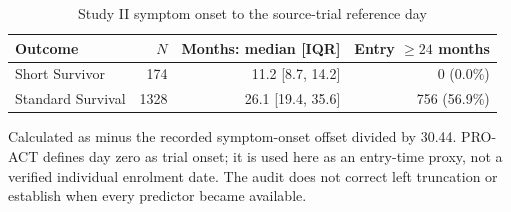 \begin{table}[ht!]
\centering
\small
\caption[Study II symptom onset to the source-trial reference day]{Study II symptom onset to the source-trial reference day}
\label{tab:review_s2_delayed_entry}
\setlength{\tabcolsep}{4pt}
\begin{tabular}{lrrr}
\toprule
Outcome & $N$ & Months: median [IQR] & Entry $\geq24$ months \\
\midrule
Short Survivor & 174 & 11.2 [8.7, 14.2] & 0 (0.0\%) \\
Standard Survival & 1328 & 26.1 [19.4, 35.6] & 756 (56.9\%) \\
\bottomrule
\end{tabular}
\par\smallskip
\begin{minipage}{0.98\linewidth}\footnotesize
Calculated as minus the recorded symptom-onset offset divided by 30.44. PRO-ACT defines day zero as trial onset; it is used here as an entry-time proxy, not a verified individual enrolment date. The audit does not correct left truncation or establish when every predictor became available.
\end{minipage}
\end{table}
